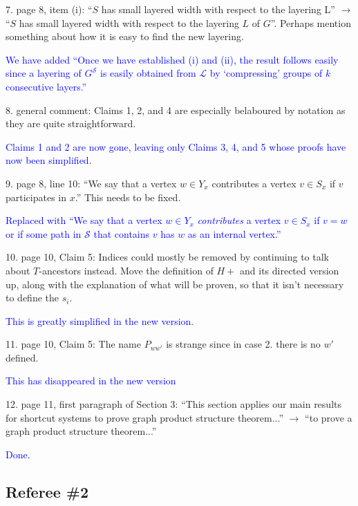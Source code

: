 \documentclass[12pt]{article}
\newcommand{\done}{\textcolor{blue}{Done.}}
\begin{document}
7. page 8, item (i): ``$S$ has small layered width with respect to the layering
L'' $\longrightarrow$ ``$S$ has small layered width with respect to the layering $L$ of
$G$''. Perhaps mention something about how it is easy to find the new layering.

\textcolor{blue}{We have added ``Once we have established (i) and (ii), the result follows easily since a layering of $G^\mathcal{S}$ is easily obtained from $\mathcal{L}$ by `compressing' groups of $k$ consecutive layers.''}

8. general comment: Claims 1, 2, and 4 are especially belaboured by
notation as they are quite straightforward.

\textcolor{blue}{Claims 1 and 2 are now gone, leaving only Claims 3, 4, and 5 whose proofs have now been simplified.}

9. page 8, line 10: ``We say that a vertex $w \in Y_x$ contributes a vertex
$v \in S_x$ if $v$ participates in $x$.'' This needs to be fixed.

\textcolor{blue}{Replaced with ``We say that a vertex $w\in Y_x$ \emph{contributes} a vertex $v\in S_x$ if $v=w$ or if some path in $\mathcal{S}$ that contains $v$ has $w$ as an internal vertex.''}

10. page 10, Claim 5: Indices could mostly be removed by continuing
to talk about $T$-ancestors instead. Move the definition of $H+$ and its
directed version up, along with the explanation of what will be proven,
so that it isn’t necessary to define the $s_i$.

\textcolor{blue}{This is greatly simplified in the new version.}

11. page 10, Claim 5: The name $P_{ww'}$ is strange since in case 2. there is
no $w'$ defined.

\textcolor{blue}{This has disappeared in the new version}

12. page 11, first paragraph of Section 3: ``This section applies our main results for shortcut systems to prove graph product structure theorem...'' $\longrightarrow$ ``to prove a graph product structure theorem...''

\done

\subsection*{Referee \#2}
\end{document}
